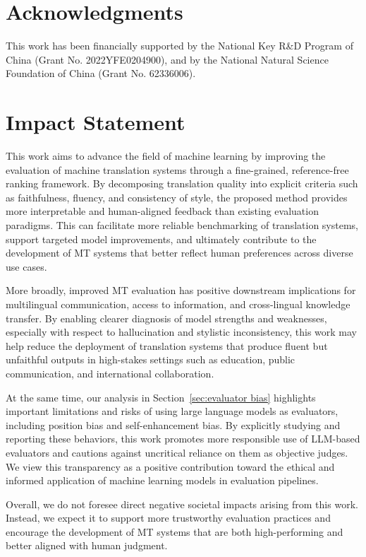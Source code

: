 \documentclass{article}
\theoremstyle{plain}
\theoremstyle{definition}
\theoremstyle{remark}
\begin{document}
\newpage

\section*{Acknowledgments}
This work has been financially supported by the National Key R\&D Program of China (Grant No. 2022YFE0204900), and by the National Natural Science Foundation of China (Grant No. 62336006).

\section*{Impact Statement}
This work aims to advance the field of machine learning by improving the evaluation of machine translation systems through a fine-grained, reference-free ranking framework. By decomposing translation quality into explicit criteria such as faithfulness, fluency, and consistency of style, the proposed method provides more interpretable and human-aligned feedback than existing evaluation paradigms. This can facilitate more reliable benchmarking of translation systems, support targeted model improvements, and ultimately contribute to the development of MT systems that better reflect human preferences across diverse use cases.

More broadly, improved MT evaluation has positive downstream implications for multilingual communication, access to information, and cross-lingual knowledge transfer. By enabling clearer diagnosis of model strengths and weaknesses, especially with respect to hallucination and stylistic inconsistency, this work may help reduce the deployment of translation systems that produce fluent but unfaithful outputs in high-stakes settings such as education, public communication, and international collaboration.

At the same time, our analysis in Section~\ref{sec:evaluator bias} highlights important limitations and risks of using large language models as evaluators, including position bias and self-enhancement bias. By explicitly studying and reporting these behaviors, this work promotes more responsible use of LLM-based evaluators and cautions against uncritical reliance on them as objective judges. We view this transparency as a positive contribution toward the ethical and informed application of machine learning models in evaluation pipelines.

Overall, we do not foresee direct negative societal impacts arising from this work. Instead, we expect it to support more trustworthy evaluation practices and encourage the development of MT systems that are both high-performing and better aligned with human judgment.
\end{document}
